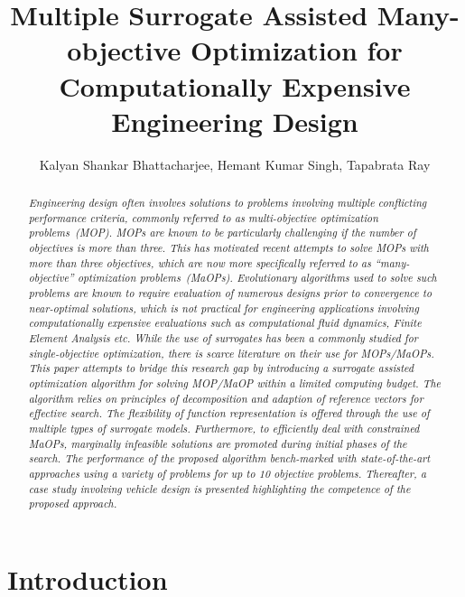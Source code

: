 \documentclass[twocolumn,10pt]{asme2ej}
\title{Multiple Surrogate Assisted Many-objective Optimization for {\color{blue}Computationally Expensive} Engineering Design}
\author{Kalyan Shankar Bhattacharjee, Hemant Kumar Singh, Tapabrata Ray
	\affiliation{
		School of Engineering and IT, The University of New South Wales, Canberra, Australia\\
		Email: k.bhattacharjee@student.adfa.edu.au, \{h.singh,t.ray\}adfa.edu.au\\
	}	
}
\begin{document}
\maketitle    


\begin{abstract}
	{\it Engineering design often involves solutions to problems involving
multiple conflicting performance criteria, commonly
referred to as multi-objective optimization problems~(MOP).
MOPs are known to be particularly challenging if the number
of objectives is more than three. This has motivated recent attempts to solve MOPs with more than
three objectives, which are now more specifically referred to
{\color{blue}as ``many-objective'' optimization problems}~(MaOPs). Evolutionary algorithms used to solve such problems are known to require
evaluation of numerous designs prior to convergence
to near-optimal solutions, which is not practical for engineering applications involving computationally
expensive evaluations such as computational fluid
dynamics, Finite Element Analysis etc. While
the use of surrogates has been a commonly studied for single-objective
optimization, there is scarce literature on their use
for MOPs/MaOPs. This paper attempts
to bridge this research gap by introducing a surrogate assisted
optimization algorithm for solving MOP/MaOP within a limited computing
budget. The algorithm relies on principles of decomposition
and adaption of reference vectors for effective search.
The flexibility of function representation is offered through
the use of multiple types of surrogate models. Furthermore,
to efficiently deal with constrained MaOPs, marginally infeasible
solutions are promoted during initial phases of the
search. The performance of the proposed algorithm bench-marked with state-of-the-art approaches
using a variety of problems for up to 10 objective problems. Thereafter, a
case study involving {\color{blue}vehicle design} is presented
highlighting the competence of the proposed approach.}
\end{abstract}


\section{Introduction}
\label{sec:KHTsec:1}
\end{document}

